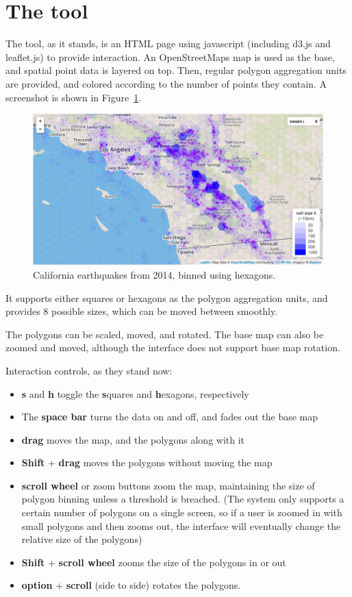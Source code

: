 \documentclass{article}\usepackage[]{graphicx}\usepackage[]{color}
\begin{document}
\section{The tool}

The tool, as it stands, is an HTML page using javascript (including d3.js and leaflet.js) to provide interaction. An OpenStreetMaps map is used as the base, and spatial point data is layered on top. Then, regular polygon aggregation units are provided, and colored according to the number of points they contain. A screenshot is shown in Figure~\ref{tool}.

\begin{figure}[htbp]
\begin{centering}
\includegraphics[width=\textwidth]{../img/tool.png}
\caption{California earthquakes from 2014, binned using hexagons.}\label{tool}
\end{centering}
\end{figure}

It supports either squares or hexagons as the polygon aggregation units, and provides 8 possible sizes, which can be moved between smoothly. 

The polygons can be scaled, moved, and rotated. The base map can also be zoomed and moved, although the interface does not support base map rotation. 

Interaction controls, as they stand now:
\begin{itemize}
\item \textbf{s} and \textbf{h} toggle the \textbf{s}quares and \textbf{h}exagons, respectively
\item The \textbf{space bar} turns the data on and off, and fades out the base map
\item \textbf{drag} moves the map, and the polygons along with it
\item \textbf{Shift} + \textbf{drag} moves the polygons without moving the map
\item \textbf{scroll wheel} or zoom buttons zoom the map, maintaining the size of polygon binning unless a threshold is breached. (The system only supports a certain number of polygons on a single screen, so if a user is zoomed in with small polygons and then zooms out, the interface will eventually change the relative size of the polygons)
\item \textbf{Shift} + \textbf{scroll wheel} zooms the size of the polygons in or out
\item \textbf{option} + \textbf{scroll} (side to side) rotates the polygons. 
\end{itemize}
\end{document}
